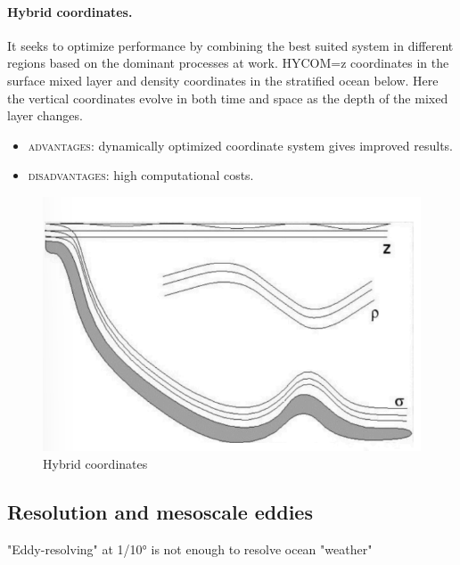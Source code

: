 \paragraph{Hybrid coordinates.} It seeks to optimize performance by combining the best suited system in different regions based on the dominant processes at work. HYCOM=z coordinates in the surface mixed layer and density coordinates in the stratified ocean below. Here the vertical coordinates evolve in both time and space as the depth of the mixed layer changes.
\begin{itemize}
	\item \textsc{advantages}: dynamically optimized coordinate system gives improved results.
	\item\textsc{disadvantages}: high computational costs.
\end{itemize}

\begin{figure}[htp!]
	\centering
	\includegraphics[width=0.5\linewidth]{uploads/Screenshot 2024-11-22 000943.png}
	\caption{Hybrid coordinates}
	\label{fig:enter-label}
\end{figure}
\subsection{Resolution and mesoscale eddies}
\begin{centering}
	"Eddy-resolving" at 1/10° is not enough to resolve ocean "weather"
\end{centering}
\\[0.25 cm]

